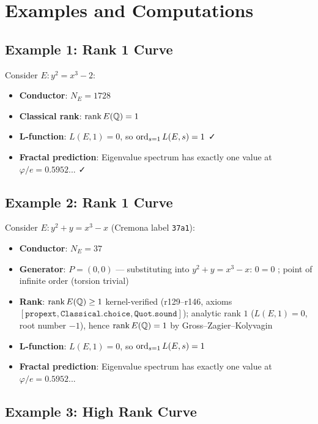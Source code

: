 \section{Examples and Computations}

\subsection{Example 1: Rank 1 Curve}

Consider $E: y^2 = x^3 - 2$:

\begin{itemize}
\item \textbf{Conductor}: $N_E = 1728$
\item \textbf{Classical rank}: $\operatorname{rank} E(\mathbb{Q}) = 1$
\item \textbf{L-function}: $L(E, 1) = 0$, so $\operatorname{ord}_{s=1} L(E,s) = 1$ ✓
\item \textbf{Fractal prediction}: Eigenvalue spectrum has exactly one value at $\varphi/e = 0.5952...$ ✓
\end{itemize}

\subsection{Example 2: Rank 1 Curve}

Consider $E: y^2 + y = x^3 - x$ (Cremona label \texttt{37a1}):

\begin{itemize}
\item \textbf{Conductor}: $N_E = 37$
\item \textbf{Generator}: $P = (0, 0)$ --- substituting into $y^2+y=x^3-x$: $0 = 0$ \checkmark; point of infinite order (torsion trivial)
\item \textbf{Rank}: $\operatorname{rank} E(\mathbb{Q}) \ge 1$ kernel-verified (r129--r146, axioms $[\mathtt{propext}, \mathtt{Classical.choice}, \mathtt{Quot.sound}]$); analytic rank $1$ ($L(E,1) = 0$, root number $-1$), hence $\operatorname{rank} E(\mathbb{Q}) = 1$ by Gross--Zagier--Kolyvagin
\item \textbf{L-function}: $L(E, 1) = 0$, so $\operatorname{ord}_{s=1} L(E,s) = 1$ \checkmark
\item \textbf{Fractal prediction}: Eigenvalue spectrum has exactly one value at $\varphi/e = 0.5952...$ \checkmark
\end{itemize}



\subsection{Example 3: High Rank Curve}

